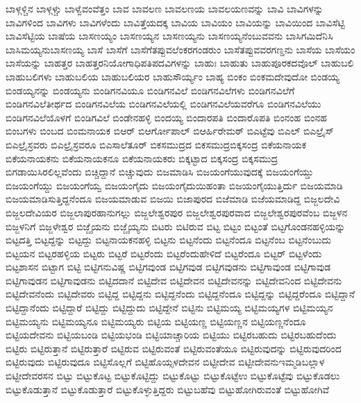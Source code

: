 {ಬಾಳ್ಗಳ್ಚಿನ
ಬಾಳ್ಗಳ್ಚು
ಬಾಳ್ವೆವಂವೆತ್ತಂ
ಬಾವ
ಬಾವಲಣ
ಬಾವಲಣಯ
ಬಾವಲಯಣವನ್ನು
ಬಾವಿ
ಬಾವಿಗಳನ್ನು
ಬಾವಿಗಳಿಂದ
ಬಾವಿಗಳು
ಬಾವಿಗಳೆಂದು
ಬಾವಿತ್ತೆಯದಕ್ಕ
ಬಾವಿಯ
ಬಾವಿಯಂ
ಬಾವಿಯನ್ನು
ಬಾವಿಯಿಂದ
ಬಾವಿಸೆಟ್ಟಿ
ಬಾವಿಸೆಟ್ಟಿಯ
ಬಾಷೆಯ
ಬಾಸಣಯ್ಯಂ
ಬಾಸಣಯ್ಯನ
ಬಾಸಣಯ್ಯನು
ಬಾಸಣಯ್ಯನೆಂಬುವವನು
ಬಾಸಿಗಮಿದೆನಿಸಿ
ಬಾಸಿಮಯ್ಯನುಬಾಸಣಯ್ಯ
ಬಾಸೆ
ಬಾಸೆಗೆ
ಬಾಸೆಗೆತಪ್ಪುವಲೆಂಕರಗಂಡರುಂ
ಬಾಸೆತಪ್ಪುವವರಗಣ್ಡನು
ಬಾಸೆಯ
ಬಾಸೆಯಂ
ಬಾಸೆಯನ್ನು
ಬಾಹತ್ತರ
ಬಾಹತ್ತರನಿಯೋಗಾಧಿಪತಿಪದವಿಗಳನ್ನು
ಬಾಹುಃ
ಬಾಹುತು
ಬಾಹುಪೂರಕದವೊಲ್
ಬಾಹುಬಲಿ
ಬಾಹುಬಲಿಗಳು
ಬಾಹುಬಲಿಯ
ಬಾಹುಬಲಿಯರ
ಬಾಹುಸೌರ್ಯ್ಯಂ
ಬಾಹ್ಯ
ಬಿಂಕಂ
ಬಿಂಕಮದೇವುದೋ
ಬಿಂಡಯ್ಯ
ಬಿಂಡಯ್ಯನನ್ನು
ಬಿಂಡಯ್ಯನು
ಬಿಂಡಿಗನವಿಯೂ
ಬಿಂಡಿಗನವಿಲೆ
ಬಿಂಡಿಗನವಿಲೆಗಳು
ಬಿಂಡಿಗನವಿಲೆಗೆ
ಬಿಂಡಿಗನವಿಲೆತೀರ್ಥದ
ಬಿಂಡಿಗನವಿಲೆಯ
ಬಿಂಡಿಗನವಿಲೆಯಲ್ಲಿ
ಬಿಂಡಿಗನವಿಲೆಯವರೆಗೂ
ಬಿಂಡಿಗನವಿಲೆಯು
ಬಿಂಡಿಗನವಿಲೆಯೊಳಗೆ
ಬಿಂಡಿಗವಿಲೆ
ಬಿಂಡೇನಹಳ್ಳಿ
ಬಿಂದಯ್ಯ
ಬಿಂದಾರಪತಿ
ಬಿಂದಾರೊಪತಿ
ಬಿಂನಂಹ
ಬಿಂನಹ
ಬಿಂಬಗಳು
ಬಿಂಬದ
ಬಿಂಮನಾಯಕ
ಬಿಆರ್
ಬಿಆರ್ಗೋಪಾಲ್
ಬಿಆರ್ಹಿರೇಮಠ್
ಬಿಎಟ್ಟೆವು
ಬಿಎಲ್
ಬಿಎಲ್ರೈಸ್
ಬಿಎಲ್ರೈಸ್ರವರು
ಬಿಎಲ್ರೈಸ್ರವರೂ
ಬಿಎಸಾಲೆತೂರ್
ಬಿಕಸಮುದ್ರದ
ಬಿಕಸಮುದ್ರಬಿಕ್ಕಸಂದ್ರ
ಬಿಕೆಯನಾಯಕ
ಬಿಕೆಯನಾಯಕನು
ಬಿಕೆಯನಾಯಕನೂ
ಬಿಕೆಯನಾಯಕರು
ಬಿಕ್ಕಟ್ಟಾದ
ಬಿಕ್ಕಸಂದ್ರ
ಬಿಕ್ಕಸಮುದ್ರ
ಬಿಗಡಾಯಿಸಿರಲಿಲ್ಲವೆಂದು
ಬಿಚ್ಚಿದ್ದಾನೆ
ಬಿಚ್ಚುವುದು
ಬಿಜಮಾಡಿಸಿ
ಬಿಜಯಂಗೆಯುವುದಕ್ಕೆ
ಬಿಜಯಂಗೆಯ್ಡು
ಬಿಜಯಂಗೆಯ್ದು
ಬಿಜಯಂಗೆಯ್ವ
ಬಿಜಯಂಗೈದು
ಬಿಜಯಂಗೈದುಯಿಹಂತಾ
ಬಿಜಯಂಗೈಯುತ್ತಿರ್ದು
ಬಿಜಯಮಾಡಿ
ಬಿಜಯಮಾಡಿಸುತ್ತಿದ್ದನೆಂದೂ
ಬಿಜಯಮಾಡುವ
ಬಿಜಯಿ
ಬಿಜಾಪುರದ
ಬಿಜೆಮಾಡಿ
ಬಿಜೆಯಮಾಡಿದ್ದ
ಬಿಜ್ಜಲದೇವಿ
ಬಿಜ್ಜಲದೇವಿಯರ
ಬಿಜ್ಜಲಾಪುರಹಾನುಗಲ್ಲು
ಬಿಜ್ಜಲೇಶ್ವರಪುರ
ಬಿಜ್ಜಲೇಶ್ವರಪುರವಾದ
ಬಿಜ್ಜಲೇಶ್ವರಪುರವೆಂಬ
ಬಿಜ್ಜಳನ
ಬಿಜ್ಜಳನಿಗೆ
ಬಿಜ್ಜಳೇಶ್ವರ
ಬಿಜ್ಜೈಯನು
ಬಿಜ್ಜೈಯ್ಯನು
ಬಿಟರು
ಬಿಟಿರುವ
ಬಿಟ್ಟ
ಬಿಟ್ಟಂ
ಬಿಟ್ಟಂತೆ
ಬಿಟ್ಟಗೊಂಡನಹಳ್ಳಿಯನ್ನು
ಬಿಟ್ಟದತ್ತಿ
ಬಿಟ್ಟದ್ದನ್ನು
ಬಿಟ್ಟದ್ದು
ಬಿಟ್ಟನಾಯಕನಹಳ್ಳಿ
ಬಿಟ್ಟನು
ಬಿಟ್ಟನೆಂದು
ಬಿಟ್ಟನೆಂದೂ
ಬಿಟ್ಟನೆಂಬ
ಬಿಟ್ಟನೆಂಬುದು
ಬಿಟ್ಟಯನ
ಬಿಟ್ಟರಹಳ್ಳಿಯ
ಬಿಟ್ಟರು
ಬಿಟ್ಟರೆ
ಬಿಟ್ಟರೆಂದು
ಬಿಟ್ಟರೆಂದುಹೇಳಿದೆ
ಬಿಟ್ಟರೆಂದೂ
ಬಿಟ್ಟರ್
ಬಿಟ್ಟಳೆಂದು
ಬಿಟ್ಟಶಾಸನ
ಬಿಟ್ಟಾಗ
ಬಿಟ್ಟಿ
ಬಿಟ್ಟಿಗನುವಿಷ್ಣ
ಬಿಟ್ಟಿಗವುಂಡ
ಬಿಟ್ಟಿಗವುಡ
ಬಿಟ್ಟಿಗವುಡನು
ಬಿಟ್ಟಿಗಾವುಂಡ
ಬಿಟ್ಟಿಗಾವುಡ
ಬಿಟ್ಟಿಗಾವುಡನ
ಬಿಟ್ಟಿಗಾವುಡನು
ಬಿಟ್ಟಿದದಾನೆ
ಬಿಟ್ಟಿದೇವ
ಬಿಟ್ಟಿದೇವನ
ಬಿಟ್ಟಿದೇವನನ್ನು
ಬಿಟ್ಟಿದೇವನಿಂದ
ಬಿಟ್ಟಿದೇವನು
ಬಿಟ್ಟಿದೇವನೆಂದು
ಬಿಟ್ಟಿದೇವರು
ಬಿಟ್ಟಿದ್ದ
ಬಿಟ್ಟಿದ್ದನು
ಬಿಟ್ಟಿದ್ದನೆಂದು
ಬಿಟ್ಟಿದ್ದನೆಂದೂ
ಬಿಟ್ಟಿದ್ದನ್ನು
ಬಿಟ್ಟಿದ್ದರೆಂದೂ
ಬಿಟ್ಟಿದ್ದಾನೆ
ಬಿಟ್ಟಿದ್ದಾನೆಂದು
ಬಿಟ್ಟಿದ್ದಾರೆ
ಬಿಟ್ಟಿದ್ದು
ಬಿಟ್ಟಿದ್ದುದು
ಬಿಟ್ಟಿದ್ದೇನೆ
ಬಿಟ್ಟಿನು
ಬಿಟ್ಟಿಮಯ್ಯ
ಬಿಟ್ಟಿಮಯ್ಯಗಳ
ಬಿಟ್ಟಿಮಯ್ಯನ
ಬಿಟ್ಟಿಮಯ್ಯನು
ಬಿಟ್ಟಿಮಯ್ಯನೂ
ಬಿಟ್ಟಿಮಯ್ಯರು
ಬಿಟ್ಟಿಯ
ಬಿಟ್ಟಿಯಣ್ಣ
ಬಿಟ್ಟಿಯಣ್ಣನ
ಬಿಟ್ಟಿಯಣ್ಣನೆಂದೂ
ಬಿಟ್ಟಿಯದೇವನು
ಬಿಟ್ಟಿಯಬಂಡಿ
ಬಿಟ್ಟಿಯಭಂಡಿ
ಬಿಟ್ಟಿಯಾಚ್ಚಾರಿಯ
ಬಿಟ್ಟಿಯು
ಬಿಟ್ಟಿರಬಹುದು
ಬಿಟ್ಟಿರಬಹುದೆಂದು
ಬಿಟ್ಟಿರು
ಬಿಟ್ಟಿರುತ್ತಾನೆ
ಬಿಟ್ಟಿರುತ್ತಾರೆ
ಬಿಟ್ಟಿರುವ
ಬಿಟ್ಟಿರುವಂತೆ
ಬಿಟ್ಟಿರುವಂತೆಯೂ
ಬಿಟ್ಟಿರುವುದನ್ನು
ಬಿಟ್ಟಿರುವುದರಿಂದ
ಬಿಟ್ಟಿರುವುದು
ಬಿಟ್ಟಿರುವುದೂ
ಬಿಟ್ಟಿಸೊಲ್ಲಗೆ
ಬಿಟ್ಟಿಹೊಯ್ಸಳದೇವನ
ಬಿಟ್ಟೀದೇವ
ಬಿಟ್ಟೀದೇವನುಇಮ್ಮಡಿಬಲ್ಲಾಳ
ಬಿಟ್ಟೀದೇವರಸನ
ಬಿಟ್ಟು
ಬಿಟ್ಟುಕೊಟ್ಟ
ಬಿಟ್ಟುಕೊಟ್ಟಿದ್ದು
ಬಿಟ್ಟುಕೊಟ್ಟು
ಬಿಟ್ಟುಕೊಟ್ಟೆಉ
ಬಿಟ್ಟುಕೊಟ್ಟೆವು
ಬಿಟ್ಟುಕೊಡಲು
ಬಿಟ್ಟುಕೊಡುತ್ತಾನೆ
ಬಿಟ್ಟುಕೊಡುತ್ತಾರೆ
ಬಿಟ್ಟುಕೊಳ್ಳುತ್ತಿದ್ದರು
ಬಿಟ್ಟುಬಹೆವು
ಬಿಟ್ಟುಹೋಗಿರುವಂತೆ
ಬಿಟ್ಟುಹೋಗಿವೆ
}
